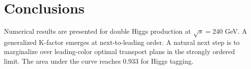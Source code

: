 \section{Conclusions}\label{sec:conclusions}

Numerical results are presented for double Higgs production at $\sqrt{s}
= 240$ GeV. A generalized K-factor emerges at next-to-leading order. A
natural next step is to marginalize over leading-color optimal transport
plans in the strongly ordered limit. The area under the curve reaches
0.933 for Higgs tagging.

